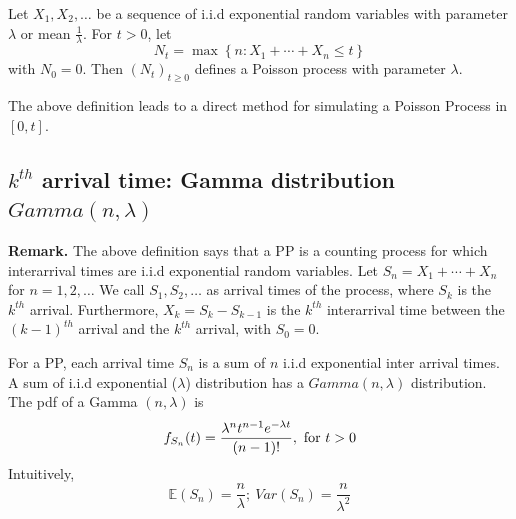 \documentclass[11pt]{elegantbook}
\begin{document}
\begin{definition}[Definition 2 of PP]
        Let $X_1, X_2, \ldots$ be a sequence of i.i.d exponential random variables with parameter $\lambda$ or mean $\frac{1}{\lambda}$. For $t>0$, let
        $$
        N_t=\max \left\{n: X_1+\cdots+X_n \leq t\right\}
        $$
        with $N_0=0$. Then $\left(N_t\right)_{t \geq 0}$ defines a Poisson process with parameter $\lambda$.
\end{definition}
\begin{claim}[ Simulation 1.]
    The above definition leads to a direct method for simulating a Poisson Process in $[0, t]$.
\end{claim}

\subsection{$k^{th}$ arrival time: Gamma distribution $Gamma(n,\lambda)$}

\textbf{Remark.} The above definition says that a PP is a counting process for which interarrival times are i.i.d exponential random variables. Let $S_n=X_1+\cdots+X_n$ for $n=1,2, \ldots$ We call $S_1, S_2, \ldots$ as arrival times of the process, where $S_k$ is the $k^{th}$ arrival. Furthermore, $X_k=S_k-S_{k-1}$ is the $k^{th}$ interarrival time between the $(k-1)^{th}$ arrival and the $k^{th}$ arrival, with $S_0=0$.

For a PP, each arrival time $S_n$ is a sum of $n$ i.i.d exponential inter arrival times. A sum of i.i.d exponential ($\lambda$) distribution has a $Gamma(n, \lambda)$ distribution. The pdf of a Gamma $(n, \lambda)$ is $$f_{S_n}(t)=\frac{\lambda^n t^{n-1}e^{-\lambda t}}{(n-1)!},\ \textnormal{for } t>0$$
Intuitively,
$$\mathbb{E}(S_n)=\frac{n}{\lambda};\ Var(S_n)=\frac{n}{\lambda^2}$$
\end{document}
